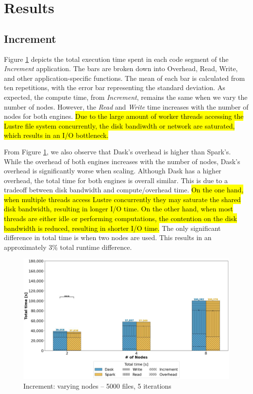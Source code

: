 \documentclass[AMA,STIX1COL]{WileyNJD-v2}
\newcommand{\HL}[1]{\hl{#1}}
\begin{document}
\section{Results}
\subsection{Increment}
Figure \ref{fig:increment_worker} depicts the total execution time spent in each code segment of the \textit{Increment} application.
The bars are broken down into Overhead, Read, Write, and other application-specific functions.
The mean of each bar is calculated from ten repetitions, with the error bar representing the standard deviation.
As expected, the compute time, from \textit{Increment}, remains the same when we vary the number of nodes.
However, the \textit{Read} and \textit{Write} time increases with the number of nodes for both engines.
\HL{
	Due to the large amount of worker threads accessing the Lustre file system
	concurrently, the disk bandiwdth or network are saturated, which results in an I/O bottleneck.
}
												
From Figure \ref{fig:increment_worker}, we also observe that Dask's overhead is higher than Spark's.
While the overhead of both engines increases with the number of nodes, Dask's overhead is significantly worse when scaling.
Although Dask has a higher overhead, the total time for both engines is overall similar.
This is due to a tradeoff between disk bandwidth and compute/overhead time.
\HL{
	On the one hand, when multiple threads access Lustre concurrently they may saturate the shared disk bandwidth, resulting in longer I/O time.
	On the other hand, when most threads are either idle or performing computations,
	the contention on the disk bandwidth is reduced, resulting in shorter I/O time.
}
The only significant difference in total time is when two nodes are used.
This results in an approximately 3\% total runtime difference.
\begin{figure}[!h]
	\centering
	\includegraphics[clip,width=0.75\columnwidth]{figures/stacked_increment_worker.jpg}
	\caption{Increment: varying nodes -- 5000 files, 5 iterations}
	\label{fig:increment_worker}
\end{figure}
														
\end{document}
